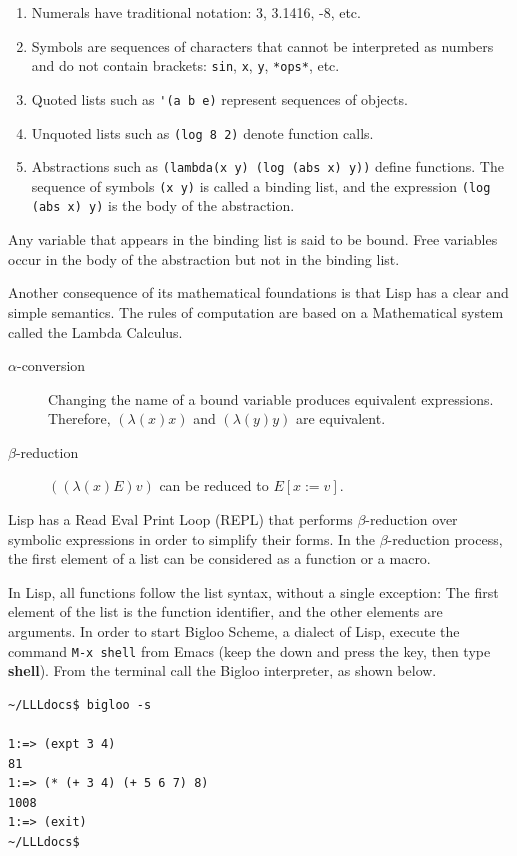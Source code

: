 \documentclass[a4paper,12pt]{book}
\begin{document}
\begin{enumerate}
\item Numerals have traditional notation: 3, 3.1416, -8, etc. 
\item Symbols are  sequences of characters that cannot be
  interpreted as numbers and do not contain brackets:
  \verb|sin|, \verb|x|, \verb|y|, \verb|*ops*|, etc.
\item Quoted lists such as \verb|'(a b e)| represent
  sequences of objects.
\item Unquoted  lists such as \verb|(log 8 2)| denote
  function calls.
\item Abstractions such as \verb|(lambda(x y) (log (abs x) y))|
  define   functions. The sequence of symbols \verb|(x y)| is called
  a binding list, and the expression \verb|(log (abs x) y)| is the
  body of the abstraction.
\end{enumerate}

Any variable that appears in the binding list is said to be bound.
Free variables occur in the body of the abstraction but not in the
binding list.

Another consequence of its mathematical foundations is that Lisp
has a clear and simple semantics. The rules of computation are
based on a Mathematical system called the Lambda Calculus.

\begin{description}
\item[$\alpha$-conversion] Changing the name of a bound variable
  produces equivalent expressions. Therefore,  $(\lambda(x) x)$
  and $(\lambda(y) y)$ are equivalent.
\item[$\beta$-reduction] $((\lambda(x) E) v)$ can be reduced
  to $E[x := v]$.
\end{description}

Lisp has a Read Eval Print Loop (REPL) that performs
$\beta$-reduction over symbolic expressions in order to
simplify their forms. In the $\beta$-reduction process,
the first element of a list can be considered as
a function or a macro.

In Lisp, all functions follow the list syntax, without a single
exception: The first element of the list is the function
identifier, and the other elements are arguments. In order to
start Bigloo Scheme, a dialect of Lisp, execute the command
\verb|M-x shell| from Emacs (keep the  down and
press the  key, then type {\bf shell}). From the
terminal call the Bigloo interpreter, as shown below.

\begin{verbatim}
~/LLLdocs$ bigloo -s

1:=> (expt 3 4)
81
1:=> (* (+ 3 4) (+ 5 6 7) 8)
1008
1:=> (exit)
~/LLLdocs$ 
\end{verbatim}
\end{document}

